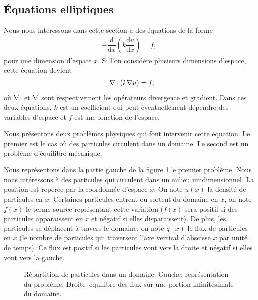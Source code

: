 \documentclass[12pt,a4paper,twoside]{article}
\begin{document}
\subsection{\'Equations elliptiques}
\label{subsec:elliptique}

Nous nous int\'eressons dans cette section \`a des \'equations de la forme
\begin{align}
  \label{eq:ell_1D}
  - \dfrac{\mathrm{d}}{\mathrm{d} x} \left(k \dfrac{\mathrm{d} u}{\mathrm{d} x} \right) = f ,
\end{align}
pour une dimension d'espace $x$.
Si l'on consid\`ere plusieurs dimensions d'espace, cette \'equation devient
\begin{align}
  \label{eq:ell_2D}
  - \DIV \left(k \GRAD u \right) = f ,
\end{align}
o\`u $\DIV$ et $\GRAD$ sont respectivement les op\'erateurs divergence et gradient.
Dans ces deux \'equations, $k$ est un coefficient qui peut \'eventuellement d\'ependre 
des variables d'espace et $f$ est une fonction de l'espace.


Nous pr\'esentons deux probl\`emes physiques qui font intervenir
cette \'equation.
Le premier est le cas o\`u des particules circulent dans un domaine.
Le second est un probl\`eme d'\'equilibre m\'ecanique.


Nous repr\'esentons dans la partie gauche de la figure \ref{fig:flux} 
le premier probl\`eme.
Nous nous int\'eressons \`a des particules qui circulent 
dans un milieu unidimensionnel. La position est
rep\'er\'ee par la coordonn\'ee d'espace $x$. On note $u(x)$ la densit\'e
de particules en $x$. Certaines particules entrent ou sortent du domaine
en $x$, on note $f(x)$ le terme source repr\'esentant cette variation
($f(x)$ sera positif si des particules apparaissent en $x$ 
et n\'egatif si elles disparaissent).
De plus, les particules se d\'eplacent \`a travers le domaine,
on note $q(x)$ le flux de particules en $x$
(le nombre de particules qui traversent l'axe vertical d'abscisse $x$
par unit\'e de temps). Ce flux est positif si les particules 
vont vers la droite et n\'egatif si elles vont vers la gauche.

\begin{figure}
\begin{tikzpicture}[scale = 3]
  
\end{tikzpicture}
\begin{tikzpicture}[scale = 2.5]
  
\end{tikzpicture}
\caption{R\'epartition de particules dans un domaine. Gauche: repr\'esentation du probl\`eme.
  Droite: \'equilibre des flux sur une portion infinit\'esimale du domaine.}
\label{fig:flux}
\end{figure}
\end{document}
